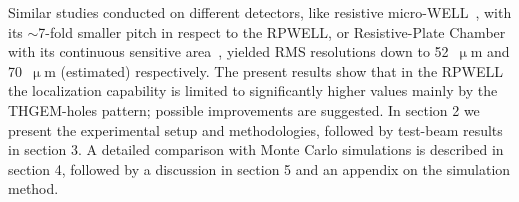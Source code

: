 Similar studies conducted on different detectors, like resistive micro-WELL~\cite{lener2016mu}, with its $\sim$7-fold smaller pitch in respect to the RPWELL, or Resistive-Plate Chamber with its continuous sensitive area~\cite{aielli2014rpc}, yielded RMS resolutions down to 52~$\upmu$m and 70~$\upmu$m (estimated) respectively. The present results show that in the RPWELL the localization capability is limited to significantly higher values mainly by the THGEM-holes pattern; possible improvements are suggested.
In section 2 we present the experimental setup and methodologies, followed by test-beam results in section 3. A detailed comparison with Monte Carlo simulations is described in section 4, followed by a discussion in section 5 and an appendix on the simulation method.


